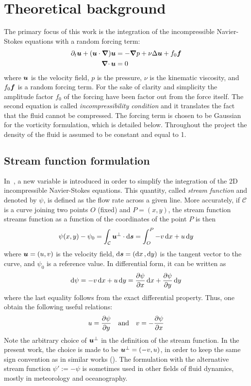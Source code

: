 \documentclass[../main.tex]{subfiles}
\begin{document}
\section{Theoretical background}
The primary focus of this work is the integration of the incompressible Navier-Stokes equations with a random forcing term:
\begin{align}
	\label{eq:navier-stokes}\partial_t \boldsymbol{u} + (\boldsymbol{u} \cdot \grad) \boldsymbol{u} & = -\grad p + \nu\Delta \boldsymbol{u} + f_0\boldsymbol{f} \\
	\label{eq:incompressibility}\operatorname{\boldsymbol{\nabla}\cdot}{\boldsymbol{u}}                               & = 0
\end{align}
where $\boldsymbol{u}$ is the velocity field, $p$ is the pressure, $\nu$ is the kinematic viscosity, and $f_0\boldsymbol{f}$ is a random forcing term. For the sake of clarity and simplicity the amplitude factor $f_0$ of the forcing have been factor out from the force itself. The second equation is called	\emph{incompressibility condition} and it translates the fact that the fluid cannot be compressed. The forcing term is chosen to be Gaussian for the vorticity formulation, which is detailed below. Throughout the project the density of the fluid is assumed to be constant and equal to 1.

\subsection{Stream function formulation}
In~\cite{Batchelor2000}, a new variable is introduced in order to simplify the integration of the 2D incompressible Navier-Stokes equations. This quantity, called \emph{stream function} and denoted by $\psi$, is defined as the flow rate across a given line. More accurately, if $\mathcal{C}$ is a curve joining two points $O$ (fixed) and $P=(x,y)$, the stream function streams function as a function of the coordinates of the point $P$ is then
\begin{equation}
	\psi(x,y) -\psi_0 = \int_{\mathcal{C}} \boldsymbol{u}^\perp \cdot \dd{\boldsymbol{s}}= \int_{O}^{P} -v \dd{x} + u \dd{y}
\end{equation}
where $\boldsymbol{u} = (u,v)$ is the velocity field, $\dd{\boldsymbol{s}}=(\dd{x},\dd{y})$ is the tangent vector to the curve, and $\psi_0$ is a reference value. In differential form, it can be written as
\begin{equation}
	\dd{\psi} = -v \dd{x} + u \dd{y} = \pdv{\psi}{x} \dd{x} + \pdv{\psi}{y} \dd{y}
\end{equation}
where the last equality follows from the exact differential property. Thus, one obtain the following useful relations:
\begin{equation}
	u = \pdv{\psi}{y} \quad \text{and} \quad v = -\pdv{\psi}{x}
\end{equation}
Note the arbitrary choice of $\boldsymbol{u}^\perp$ in the definition of the stream function. In the present work, the choice is made to be $\boldsymbol{u}^\perp = (-v,u)$, in order to keep the same sign convention as in similar works (\cite{2dturbulence,alexakisLONG}). The formulation with the alternative stream function $\psi':=-\psi$ is sometimes used in other fields of fluid dynamics, mostly in meteorology and oceanography.
\end{document}
